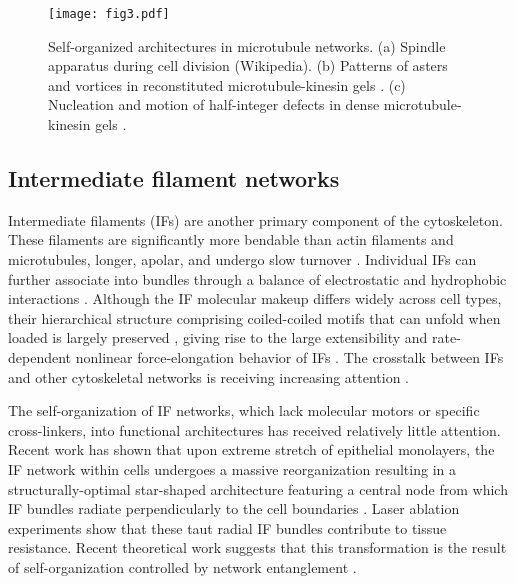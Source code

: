 \begin{figure}[hb]
	\centering
	\texttt{[image: fig3.pdf]}
	\caption{ \label{chap_1_fig_3} Self-organized architectures in microtubule networks. (a) Spindle apparatus during cell division (Wikipedia). (b) Patterns of asters and vortices in reconstituted microtubule-kinesin gels \cite{ndlec1997}. (c) Nucleation and motion of half-integer defects in dense microtubule-kinesin gels \cite{sanchez2012}.}
\end{figure}

\subsection{Intermediate filament networks}

Intermediate filaments (IFs) are another primary component of the cytoskeleton. These filaments are significantly more bendable than actin filaments and microtubules, longer, apolar, and undergo slow turnover \cite{broedersz2014,wagner2007,herrmann2007,godsel2008, lorenz2019}. Individual IFs can further associate into bundles through a balance of electrostatic and hydrophobic interactions \cite{haimov2020}. Although the IF molecular makeup differs widely across cell types, their hierarchical structure comprising coiled-coiled motifs that can unfold when loaded is largely preserved \cite{lorenz2019}, giving rise to the large extensibility and rate-dependent nonlinear force-elongation behavior of IFs \cite{kreplak2005, kreplak2008, qin2009}. %
The crosstalk between IFs and other cytoskeletal networks is receiving increasing attention \cite{huber2015}.

The self-organization of IF networks, which lack molecular motors or specific cross-linkers, into functional architectures has received relatively little attention. Recent work has shown that upon extreme stretch of epithelial monolayers, the IF network within cells undergoes a massive reorganization resulting in a structurally-optimal star-shaped architecture featuring a central node from which IF bundles radiate perpendicularly to the cell boundaries \cite{latorre2018}. Laser ablation experiments show that these taut radial IF bundles contribute to tissue resistance. Recent theoretical work suggests that this transformation is the result of self-organization controlled by network entanglement \cite{pensalfini2022}.


